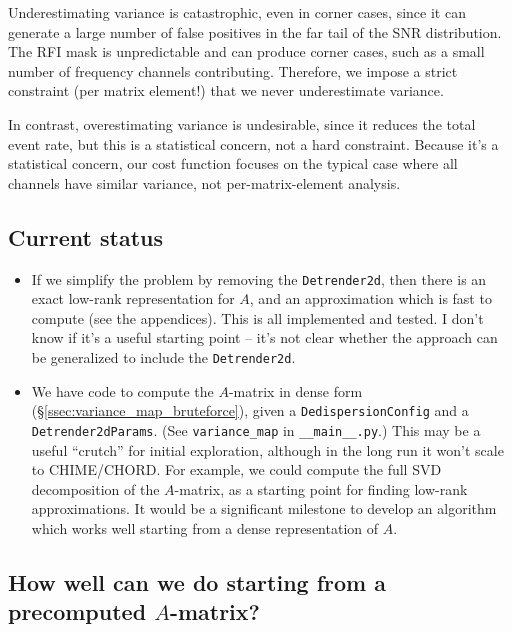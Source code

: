 \documentclass{article}
\numberwithin{equation}{section}   %
\begin{document}
Underestimating variance is catastrophic, even in corner cases, since it can generate
a large number of false positives in the far tail of the SNR distribution.
The RFI mask is unpredictable and can produce corner cases, such as a small number
of frequency channels contributing.
Therefore, we impose a strict constraint (per matrix element!) that we never underestimate
variance.

In contrast, overestimating variance is undesirable, since it reduces the total event rate,
but this is a statistical concern, not a hard constraint.
Because it's a statistical concern, our cost function focuses on the typical case where
all channels have similar variance, not per-matrix-element analysis.

\subsection{Current status}

\begin{itemize}

\item If we simplify the problem by removing the {\tt Detrender2d}, then
 there is an exact low-rank representation for $A$, and an approximation which
 is fast to compute (see the appendices). This is all implemented and tested.
 I don't know if it's a useful starting point -- it's not clear whether the
 approach can be generalized to include the {\tt Detrender2d}.

\item We have code to compute the $A$-matrix in dense form (\S\ref{ssec:variance_map_bruteforce}),
 given a {\tt DedispersionConfig} and a {\tt Detrender2dParams}. (See \verb|variance_map| in \verb|__main__.py|.)
 This may be a useful ``crutch'' for initial exploration, although in the long run it won't
 scale to CHIME/CHORD. For example, we could compute the full SVD decomposition of the $A$-matrix,
 as a starting point for finding low-rank approximations. It would be a significant milestone
 to develop an algorithm which works well starting from a dense representation of $A$.

\end{itemize}

\subsection{How well can we do starting from a precomputed $A$-matrix?}
\label{ssec:first_milestone}
\end{document}
